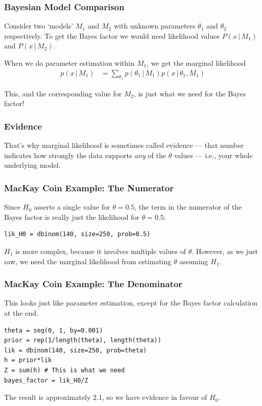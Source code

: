 \documentclass{beamer}
\newcommand{\given}{\,|\,}
\begin{document}
\begin{frame}
\frametitle{Bayesian Model Comparison}
Consider two `models' $M_1$ and $M_2$ with unknown parameters $\theta_1$
and $\theta_2$ respectively. To get the Bayes factor we would need likelihood
values $P(x \given M_1)$ and $P(x \given M_2)$.\\[0.5em]\pause

When we do parameter estimation within $M_1$, we get the marginal likelihood
\begin{align}
p(x \given M_1) &= \sum_{\theta_1} p(\theta_1 \given M_1)p(x \given \theta_1, M_1)
\end{align}

This, and the corresponding value for $M_2$, is just what we need for the Bayes factor!

\end{frame}

\begin{frame}
\frametitle{Evidence}

That's why marginal likelihood
is sometimes called evidence --- that number indicates how strongly the data supports
{\em any} of the $\theta$ values --- i.e., your whole underlying model.

\end{frame}


\begin{frame}[fragile]
\frametitle{MacKay Coin Example: The Numerator}
Since $H_0$ asserts a single value for $\theta=0.5$, the term in the numerator
of the Bayes factor is really just the likelihood for $\theta=0.5$:
\begin{verbatim}
lik_H0 = dbinom(140, size=250, prob=0.5)
\end{verbatim}
\pause

$H_1$ is more complex, because it involves multiple values of $\theta$.
However, as we just saw, we need the marginal likelihood from estimating $\theta$ assuming $H_1$.
\end{frame}

\begin{frame}[fragile]
\frametitle{MacKay Coin Example: The Denominator}
This looks just like parameter estimation, except for the Bayes factor
calculation at the end.
\begin{verbatim}
theta = seq(0, 1, by=0.001)
prior = rep(1/length(theta), length(theta))
lik = dbinom(140, size=250, prob=theta)
h = prior*lik
Z = sum(h) # This is what we need
bayes_factor = lik_H0/Z
\end{verbatim}
\pause
The result is approximately 2.1, so we have evidence in favour of
$H_0$.

\end{frame}
\end{document}
